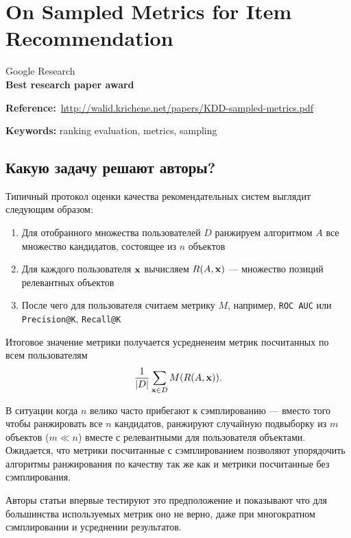 \chapter{On Sampled Metrics for Item Recommendation}

Google Research \\

\textbf{Best research paper award}

\textbf{Reference:}~\url{http://walid.krichene.net/papers/KDD-sampled-metrics.pdf}

\textbf{Keywords:} ranking evaluation, metrics, sampling

\section{Какую задачу решают авторы?}

Типичный протокол оценки качества рекомендательных систем выглядит следующим образом:
\begin{enumerate}
    \item Для отобранного множества пользователей $D$ ранжируем алгоритмом $A$ все множество кандидатов, состоящее из $n$ объектов
    \item Для каждого пользователя ${\bf x}$ вычисляем $R(A, {\bf x})$ --- множество позиций релевантных объектов
    \item После чего для пользователя считаем метрику $M$, например, \texttt{ROC AUC} или \texttt{Precision@K}, \texttt{Recall@K}
\end{enumerate}

Итоговое значение метрики получается усредненеим метрик посчитанных по всем пользователям
\begin{equation*}
    \frac{1}{|D|}\sum\limits_{{\bf x} \in D} M(R(A, {\bf x})) .
\end{equation*}

В ситуации когда $n$ велико часто прибегают к сэмплированию --- вместо того чтобы ранжировать все $n$ кандидатов, ранжируют случайную подвыборку из $m$ объектов ($ m \ll n $) вместе с релевантными для пользователя объектами. \\

Ожидается, что метрики посчитанные с сэмплированием позволяют упорядочить алгоритмы ранжирования по качеству так же как и метрики посчитанные без сэмплирования. 

Авторы статьи впервые тестируют это предположение и показывают что для большинства используемых метрик оно не верно, даже при многократном сэмплировании и усреднении результатов. \\

